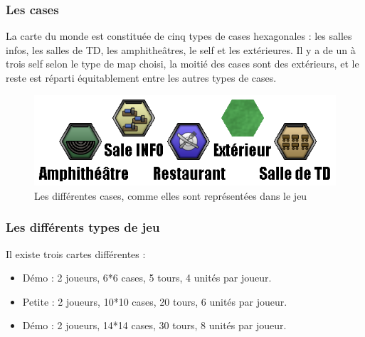 \subsubsection{Les cases}
La carte du monde est constituée de cinq types de cases hexagonales : les salles infos, les salles de TD, les amphitheâtres, le self et les extérieures.
Il y a de un à trois self selon le type de map choisi, la moitié des cases sont des extérieurs, et le reste est réparti équitablement entre les autres types de cases.
\begin{figure}[!h]
\centering
\includegraphics[width=.7\textwidth]{Parties/Images/Terrains.png}
\caption{Les différentes cases, comme elles sont représentées dans le jeu}
\label{fig:Terrains}
\end{figure}

\subsubsection{Les différents types de jeu}
Il existe trois cartes différentes :
\begin{itemize}
\item Démo : 2 joueurs, 6*6 cases, 5 tours, 4 unités par joueur.
\item Petite : 2 joueurs, 10*10 cases, 20 tours, 6 unités par joueur.
\item Démo : 2 joueurs, 14*14 cases, 30 tours, 8 unités par joueur.
\end{itemize}
